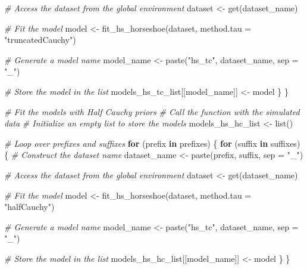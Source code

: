 \documentclass[
  11pt,
]{article}
\newenvironment{Shaded}{}{}
\newcommand{\AttributeTok}[1]{\textcolor[rgb]{0.49,0.56,0.16}{#1}}
\newcommand{\CommentTok}[1]{\textcolor[rgb]{0.38,0.63,0.69}{\textit{#1}}}
\newcommand{\ControlFlowTok}[1]{\textcolor[rgb]{0.00,0.44,0.13}{\textbf{#1}}}
\newcommand{\FunctionTok}[1]{\textcolor[rgb]{0.02,0.16,0.49}{#1}}
\newcommand{\NormalTok}[1]{#1}
\newcommand{\OtherTok}[1]{\textcolor[rgb]{0.00,0.44,0.13}{#1}}
\newcommand{\StringTok}[1]{\textcolor[rgb]{0.25,0.44,0.63}{#1}}
\begin{document}
\begin{Shaded}
\begin{Highlighting}[]
    \CommentTok{\# Access the dataset from the global environment}
\NormalTok{    dataset }\OtherTok{\textless{}{-}} \FunctionTok{get}\NormalTok{(dataset\_name)}
    
    \CommentTok{\# Fit the model}
\NormalTok{    model }\OtherTok{\textless{}{-}} \FunctionTok{fit\_hs\_horseshoe}\NormalTok{(dataset, }\AttributeTok{method.tau =} \StringTok{"truncatedCauchy"}\NormalTok{)}
    
    \CommentTok{\# Generate a model name}
\NormalTok{    model\_name }\OtherTok{\textless{}{-}} \FunctionTok{paste}\NormalTok{(}\StringTok{"hs\_tc"}\NormalTok{, dataset\_name, }\AttributeTok{sep =} \StringTok{"\_"}\NormalTok{)}
    
    \CommentTok{\# Store the model in the list}
\NormalTok{    models\_hs\_tc\_list[[model\_name]] }\OtherTok{\textless{}{-}}\NormalTok{ model}
\NormalTok{  \}}
\NormalTok{\}}

\CommentTok{\# Fit the models with Half Cauchy priors}
\CommentTok{\# Call the function with the simulated data}
\CommentTok{\# Initialize an empty list to store the models}
\NormalTok{models\_hs\_hc\_list }\OtherTok{\textless{}{-}} \FunctionTok{list}\NormalTok{()}

\CommentTok{\#   Loop over prefixes and suffixes}
\ControlFlowTok{for}\NormalTok{ (prefix }\ControlFlowTok{in}\NormalTok{ prefixes) \{}
  \ControlFlowTok{for}\NormalTok{ (suffix }\ControlFlowTok{in}\NormalTok{ suffixes) \{}
    \CommentTok{\# Construct the dataset name}
\NormalTok{    dataset\_name }\OtherTok{\textless{}{-}} \FunctionTok{paste}\NormalTok{(prefix, suffix, }\AttributeTok{sep =} \StringTok{"\_"}\NormalTok{)}
    
    \CommentTok{\# Access the dataset from the global environment}
\NormalTok{    dataset }\OtherTok{\textless{}{-}} \FunctionTok{get}\NormalTok{(dataset\_name)}
    
    \CommentTok{\# Fit the model}
\NormalTok{    model }\OtherTok{\textless{}{-}} \FunctionTok{fit\_hs\_horseshoe}\NormalTok{(dataset, }\AttributeTok{method.tau =} \StringTok{"halfCauchy"}\NormalTok{)}
    
    \CommentTok{\# Generate a model name}
\NormalTok{    model\_name }\OtherTok{\textless{}{-}} \FunctionTok{paste}\NormalTok{(}\StringTok{"hs\_tc"}\NormalTok{, dataset\_name, }\AttributeTok{sep =} \StringTok{"\_"}\NormalTok{)}
    
    \CommentTok{\# Store the model in the list}
\NormalTok{    models\_hs\_hc\_list[[model\_name]] }\OtherTok{\textless{}{-}}\NormalTok{ model}
\NormalTok{  \}}
\NormalTok{\}}


\end{Highlighting}
\end{Shaded}
\end{document}
